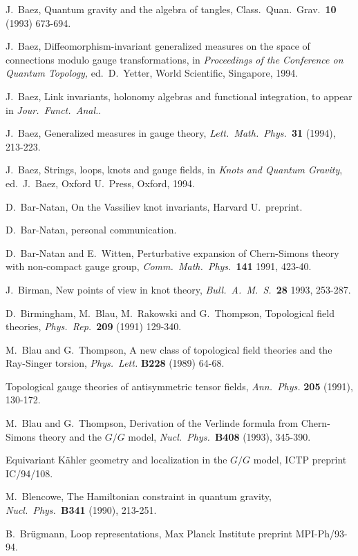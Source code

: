 \begin{thebibliography}{10}
 J.\ Baez, Quantum gravity and the algebra of
tangles, Class.\ Quan.\ Grav.\ {\bf 10} (1993) 673-694.

 J.\ Baez, Diffeomorphism-invariant generalized
measures on the space of connections modulo gauge
transformations, in {\it Proceedings of the Conference on Quantum Topology,}
ed.\ D.\ Yetter, World Scientific, Singapore, 1994.

 J.\ Baez, Link invariants, holonomy algebras and functional
integration, to appear in {\sl Jour.\ Funct.\ Anal.}.

 J.\ Baez, Generalized measures in gauge theory, {\sl Lett.\
Math.\ Phys.\ }{\bf 31} (1994), 213-223.

 J.\ Baez, Strings, loops, knots and gauge fields, in
{\sl Knots and Quantum Gravity}, ed.\ J.\ Baez, Oxford U.\ Press,
Oxford, 1994.

 D.\ Bar-Natan, On the Vassiliev knot invariants,
Harvard U.\ preprint.

 D.\ Bar-Natan, personal communication.

 D.\ Bar-Natan and E.\ Witten,
Perturbative expansion of Chern-Simons theory with non-compact gauge
group, {\sl Comm.\ Math.\ Phys.\ }{\bf 141} 1991, 423-40.

 J.\ Birman, New points of view in knot theory, {\sl
Bull.\ A.\ M.\ S.\ }{\bf 28} 1993, 253-287.

 D.\ Birmingham, M.\ Blau, M.\ Rakowski and G.\
Thompson, Topological field theories, {\sl Phys.\ Rep.\ }{\bf 209}
(1991) 129-340.

  M.\ Blau and G.\ Thompson, A new class of
topological field theories and the Ray-Singer torsion, {\sl
Phys.\ Lett.} {\bf B228} (1989) 64-68.

Topological gauge
theories of antisymmetric tensor fields, {\sl Ann.\ Phys.} {\bf
205} (1991), 130-172.

 M.\ Blau and G.\ Thompson, Derivation of the Verlinde
formula from Chern-Simons theory and the $G/G$ model, {\sl Nucl.\ Phys.\
}{\bf B408} (1993), 345-390.

Equivariant K\"ahler geometry and localization in the $G/G$ model, ICTP
preprint IC/94/108.

\bibitem{Blencowe} M.\ Blencowe, The Hamiltonian constraint in quantum
gravity, {\sl Nucl.\ Phys.\ }{\bf B341} (1990), 213-251.

\bibitem{Bruegmann} B.\ Br\"{u}gmann, Loop representations,
Max Planck Institute preprint MPI-Ph/93-94.


\end{thebibliography}
